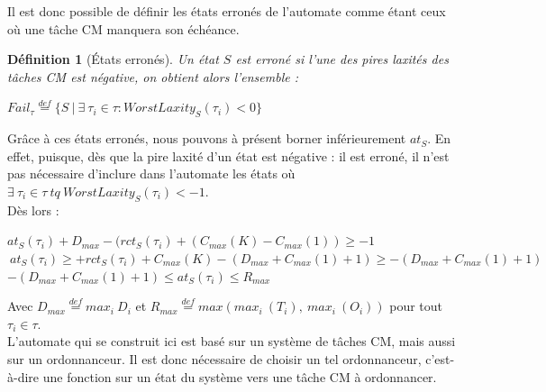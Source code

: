 \documentclass[12pt,a4paper,oneside]{book}
\theoremstyle{break}
\newtheorem{defin}{Définition}[chapter]
\theoremstyle{breakplain}
\begin{document}
Il est donc possible de définir les états erronés de l'automate comme étant ceux où une tâche CM manquera son échéance.\\

\begin{defin}[États erronés]
Un état $S$ est erroné si l'une des pires laxités des tâches CM est négative, on obtient alors l'ensemble :

\begin{center}
$Fail_\tau \overset{def}{=} \{S\ |\ \exists\ \tau_i \in \tau : WorstLaxity_S(\tau_i) < 0  \}$\\
\end{center}
\end{defin}

Grâce à ces états erronés, nous pouvons à présent borner inférieurement $at_S$. En effet, puisque, dès que la pire laxité d'un état est négative : il est erroné, il n'est pas nécessaire d'inclure dans l'automate les états où $\exists\ \tau_i \in \tau\ tq\ WorstLaxity_S(\tau_i) < -1$.\\

Dès lors :


\begin{center}
$at_S(\tau_i) + D_{max} - (rct_S(\tau_i) + (C_{max}(K)-C_{max}(1)) \geq -1$\\
$\ at_S(\tau_i) \geq + rct_S(\tau_i) + C_{max}(K) - (D_{max}+C_{max}(1)+1) \geq - (D_{max}+C_{max}(1)+1)$\\
$- (D_{max}+C_{max}(1)+1) \leq at_S(\tau_i) \leq R_{max}$
\end{center}


Avec $D_{max} \overset{def}{=} max_i\ D_i$ et $R_{max} \overset{def}{=} max(max_i\ (T_i),\ max_i\ (O_i))$ pour tout $\tau_i \in \tau$.\\

L'automate qui se construit ici est basé sur un système de tâches CM, mais aussi sur un ordonnanceur. Il est donc nécessaire de choisir un tel ordonnanceur, c'est-à-dire une fonction sur un état du système vers une tâche CM à ordonnancer.\\

\pagebreak
\end{document}
